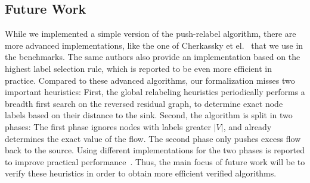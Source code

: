 \documentclass[smallcondensed]{svjour3}     %
\begin{document}
  \subsection{Future Work}
  While we implemented a simple version of the push-relabel algorithm, there are more advanced implementations, like the one of Cherkassky et el.~\cite{ChGo97} that 
  we use in the benchmarks. The same authors also provide an implementation based on the highest label selection rule, which is reported to be even more efficient 
  in practice. 
  Compared to these advanced algorithms, our formalization misses two important heuristics: First, the global relabeling heuristics periodically performs a breadth first search on the reversed residual graph, to determine exact node labels based on their distance to the sink. Second, the algorithm is split in two phases: 
  The first phase ignores nodes with labels greater $|V|$, and already determines the exact value of the flow. The second phase only pushes excess flow back to the source. 
  Using different implementations for the two phases is reported to improve practical performance~\cite{ChGo97}. 
  Thus, the main focus of future work will be to verify these heuristics in order to obtain more efficient verified algorithms.
  
\end{document}
